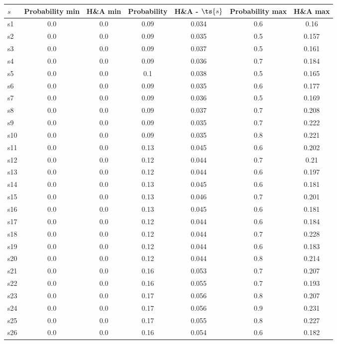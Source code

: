\documentclass{article}
\begin{document}
\noindent\begin{tabular}{|l|c|c|c|c|c|c|}
\hline
$s$& Probability min & H\&A min & Probability & H\&A - $\ts{s}$ & Probability max & H\&A max\\
\hline
s1 &0.0 & 0.0 & 0.09 & 0.034 & 0.6 & 0.16\\
\hline
s2 &0.0 & 0.0 & 0.09 & 0.035 & 0.5 & 0.157\\
\hline
s3 &0.0 & 0.0 & 0.09 & 0.037 & 0.5 & 0.161\\
\hline
s4 &0.0 & 0.0 & 0.09 & 0.036 & 0.7 & 0.184\\
\hline
s5 &0.0 & 0.0 & 0.1 & 0.038 & 0.5 & 0.165\\
\hline
s6 &0.0 & 0.0 & 0.09 & 0.035 & 0.6 & 0.177\\
\hline
s7 &0.0 & 0.0 & 0.09 & 0.036 & 0.5 & 0.169\\
\hline
s8 &0.0 & 0.0 & 0.09 & 0.037 & 0.7 & 0.208\\
\hline
s9 &0.0 & 0.0 & 0.09 & 0.035 & 0.7 & 0.222\\
\hline
s10 &0.0 & 0.0 & 0.09 & 0.035 & 0.8 & 0.221\\
\hline
s11 &0.0 & 0.0 & 0.13 & 0.045 & 0.6 & 0.202\\
\hline
s12 &0.0 & 0.0 & 0.12 & 0.044 & 0.7 & 0.21\\
\hline
s13 &0.0 & 0.0 & 0.12 & 0.044 & 0.6 & 0.197\\
\hline
s14 &0.0 & 0.0 & 0.13 & 0.045 & 0.6 & 0.181\\
\hline
s15 &0.0 & 0.0 & 0.13 & 0.046 & 0.7 & 0.201\\
\hline
s16 &0.0 & 0.0 & 0.13 & 0.045 & 0.6 & 0.181\\
\hline
s17 &0.0 & 0.0 & 0.12 & 0.044 & 0.6 & 0.184\\
\hline
s18 &0.0 & 0.0 & 0.12 & 0.044 & 0.7 & 0.228\\
\hline
s19 &0.0 & 0.0 & 0.12 & 0.044 & 0.6 & 0.183\\
\hline
s20 &0.0 & 0.0 & 0.12 & 0.044 & 0.8 & 0.214\\
\hline
s21 &0.0 & 0.0 & 0.16 & 0.053 & 0.7 & 0.207\\
\hline
s22 &0.0 & 0.0 & 0.16 & 0.055 & 0.7 & 0.193\\
\hline
s23 &0.0 & 0.0 & 0.17 & 0.056 & 0.8 & 0.207\\
\hline
s24 &0.0 & 0.0 & 0.17 & 0.056 & 0.9 & 0.231\\
\hline
s25 &0.0 & 0.0 & 0.17 & 0.055 & 0.8 & 0.227\\
\hline
s26 &0.0 & 0.0 & 0.16 & 0.054 & 0.6 & 0.182\\

\end{tabular}
\end{document}
